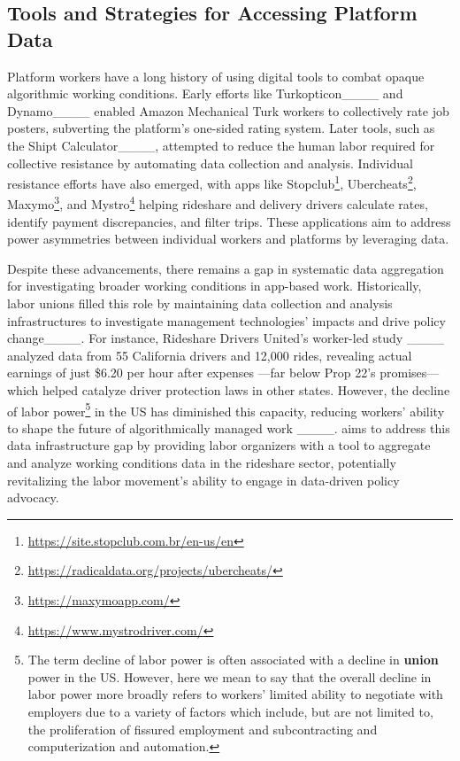 \subsection{Tools and Strategies for Accessing Platform Data}

Platform workers have a long history of using digital tools to combat opaque algorithmic working conditions. Early efforts like Turkopticon____ and Dynamo____ enabled Amazon Mechanical Turk workers to collectively rate job posters, subverting the platform's one-sided rating system. Later tools, such as the Shipt Calculator____, attempted to reduce the human labor required for collective resistance by automating data collection and analysis. Individual resistance efforts have also emerged, with apps like Stopclub\footnote{\url{https://site.stopclub.com.br/en-us/en}}, Ubercheats\footnote{\url{https://radicaldata.org/projects/ubercheats/}}, Maxymo\footnote{\url{https://maxymoapp.com/}}, and Mystro\footnote{\url{https://www.mystrodriver.com/}} helping rideshare and delivery drivers calculate rates, identify payment discrepancies, and filter trips. These applications aim to address power asymmetries between individual workers and platforms by leveraging data.

Despite these advancements, there remains a gap in systematic data aggregation for investigating broader working conditions in app-based work. Historically, labor unions filled this role by maintaining data collection and analysis infrastructures to investigate management technologies' impacts and drive policy change____. 
For instance, Rideshare Drivers United's worker-led study ____ analyzed data from 55 California drivers and 12,000 rides, revealing actual earnings of just \$6.20 per hour after expenses ---far below Prop 22's promises--- which helped catalyze driver protection laws in other states.
However, the decline of labor power\footnote{The term decline of labor power is often associated with a decline in \textbf{union} power in the US. However, here we mean to say that the overall decline in labor power more broadly refers to workers' limited ability to negotiate with employers due to a variety of factors which include, but are not limited to, the proliferation of fissured employment and subcontracting and computerization and automation. } in the US has diminished this capacity, reducing workers' ability to shape the future of algorithmically managed work ____. \Sys{} aims to address this data infrastructure gap by providing labor organizers with a tool to aggregate and analyze working conditions data in the rideshare sector, potentially revitalizing the labor movement's ability to engage in data-driven policy advocacy.


